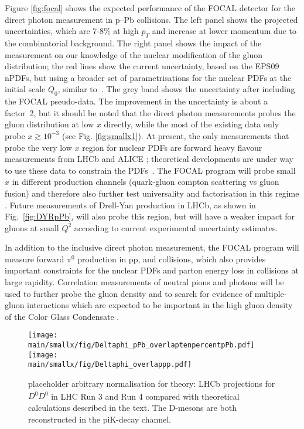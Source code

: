 \documentclass[../report.tex]{subfiles}
\providecommand{\main}{..}
\begin{document}
Figure \ref{fig:focal} shows the expected performance of the FOCAL detector for the direct photon measurement in p--Pb collisions. The left panel shows the projected uncertainties, which are 7-8\% at high $p_{T}$ and increase at lower momentum due to the combinatorial background. The right panel shows the impact of the measurement on our knowledge of the nuclear modification of the gluon distribution; the red lines show the current uncertainty, based on the EPS09 nPDFs, but using a broader set of parametrisations for the nuclear PDFs at the initial scale $Q_0$, similar to~\cite{Aschenauer:2017oxs}. The grey band shows the uncertainty after including the FOCAL pseudo-data. The improvement in the uncertainty is about a factor~2, but it should be noted that the direct photon measurements probes the gluon distribution at low $x$ directly, while the most of the existing data only probe $x \gtrsim 10^{-3}$ (see Fig. \ref{fig:smallx1}). At present, the only measurements that probe the very low $x$ region for nuclear PDFs are forward heavy flavour measurements from LHCb \cite{Aaij:2017gcy,Aaij:2017cqq} and ALICE \cite{Acharya:2017hdv}; theoretical developments are under way to use these data to constrain the PDFs~\cite{Kusina:2017gkz,Helenius:2018uul}. The FOCAL program will probe small $x$ in different production channels (quark-gluon compton scattering vs gluon fusion) and therefore also further test universality and factorisation in this regime \cite{Helenius:2014qla}. Future measurements of Drell-Yan production in LHCb, as shown in Fig.~\ref{fig:DYRpPb}, will also probe this region, but will have a weaker impact for gluons at small $Q^2$ according to current experimental uncertainty estimates. 

In addition to the inclusive direct photon measurement, the FOCAL program will measure forward $\pi^{0}$ production in pp, \pPb and \PbPb collisions, which also provides important constraints for the nuclear PDFs and parton energy loss in \PbPb collisions at large rapidity. Correlation measurements of neutral pions and photons will be used to further probe the gluon density and to search for evidence of multiple-gluon interactions which are expected to be important in the high gluon density of the Color Glass Condensate \cite{Kharzeev:2004bw,vanHameren:2014lna}.



\clearpage
\newpage


\begin{figure}
\texttt{[image: \\main/smallx/fig/Deltaphi\_pPb\_overlaptenpercentpPb.pdf]}
\texttt{[image: \\main/smallx/fig/Deltaphi\_overlappp.pdf]}
\caption{ placeholder arbitrary normalisation for theory: LHCb projections for $D^0 \overline{D^0}$ in LHC Run 3 and Run 4 compared with theoretical calculations described in the text. The D-mesons are  both reconstructed in the piK-decay channel.}
\label{fig:ccbarlhcb}
\end{figure}
\end{document}

